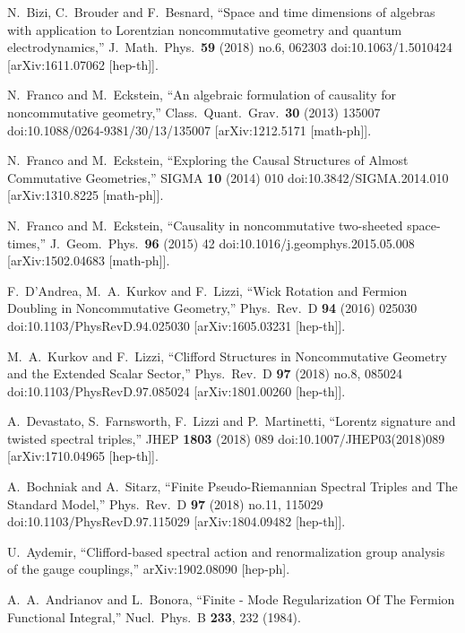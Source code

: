 \documentclass[12pt,a4paper]{article}
\begin{document}
\begin{thebibliography}{99}
  N.~Bizi, C.~Brouder and F.~Besnard,
  ``Space and time dimensions of algebras with application to Lorentzian noncommutative geometry and quantum electrodynamics,''
  J.\ Math.\ Phys.\  {\bf 59} (2018) no.6,  062303
  doi:10.1063/1.5010424
  [arXiv:1611.07062 [hep-th]].

  N.~Franco and M.~Eckstein,
  ``An algebraic formulation of causality for noncommutative geometry,''
  Class.\ Quant.\ Grav.\  {\bf 30} (2013) 135007
  doi:10.1088/0264-9381/30/13/135007
  [arXiv:1212.5171 [math-ph]].

  N.~Franco and M.~Eckstein,
  ``Exploring the Causal Structures of Almost Commutative Geometries,''
  SIGMA {\bf 10} (2014) 010
  doi:10.3842/SIGMA.2014.010
  [arXiv:1310.8225 [math-ph]].
  
  N.~Franco and M.~Eckstein,
  ``Causality in noncommutative two-sheeted space-times,''
  J.\ Geom.\ Phys.\  {\bf 96} (2015) 42
  doi:10.1016/j.geomphys.2015.05.008
  [arXiv:1502.04683 [math-ph]].
 
  F.~D'Andrea, M.~A.~Kurkov and F.~Lizzi,
  ``Wick Rotation and Fermion Doubling in Noncommutative Geometry,''
  Phys.\ Rev.\ D {\bf 94} (2016) 025030
  doi:10.1103/PhysRevD.94.025030
  [arXiv:1605.03231 [hep-th]].

  M.~A.~Kurkov and F.~Lizzi,
  ``Clifford Structures in Noncommutative Geometry and the Extended Scalar Sector,''
  Phys.\ Rev.\ D {\bf 97} (2018) no.8,  085024
  doi:10.1103/PhysRevD.97.085024
  [arXiv:1801.00260 [hep-th]].

  A.~Devastato, S.~Farnsworth, F.~Lizzi and P.~Martinetti,
  ``Lorentz signature and twisted spectral triples,''
  JHEP {\bf 1803} (2018) 089
  doi:10.1007/JHEP03(2018)089
  [arXiv:1710.04965 [hep-th]].

  A.~Bochniak and A.~Sitarz,
  ``Finite Pseudo-Riemannian Spectral Triples and The Standard Model,''
  Phys.\ Rev.\ D {\bf 97} (2018) no.11,  115029
  doi:10.1103/PhysRevD.97.115029
  [arXiv:1804.09482 [hep-th]].
  
  U.~Aydemir,
  ``Clifford-based spectral action and renormalization group analysis of the gauge couplings,''
  arXiv:1902.08090 [hep-ph].

  A.~A.~Andrianov and L.~Bonora,
  ``Finite - Mode Regularization Of The Fermion Functional Integral,''
  Nucl.\ Phys.\  B {\bf 233}, 232 (1984).


\end{thebibliography}
\end{document}
